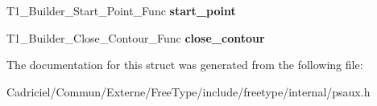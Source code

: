 \begin{DoxyCompactItemize}
\item 
\hypertarget{struct_t1___builder___funcs_rec___ab4897186c65875b4312d4ef68aad9d02}{T1\-\_\-\-Builder\-\_\-\-Start\-\_\-\-Point\-\_\-\-Func {\bfseries start\-\_\-point}}\label{struct_t1___builder___funcs_rec___ab4897186c65875b4312d4ef68aad9d02}

\item 
\hypertarget{struct_t1___builder___funcs_rec___abe163896432cc768719bf87cef0d1266}{T1\-\_\-\-Builder\-\_\-\-Close\-\_\-\-Contour\-\_\-\-Func {\bfseries close\-\_\-contour}}\label{struct_t1___builder___funcs_rec___abe163896432cc768719bf87cef0d1266}

\end{DoxyCompactItemize}


The documentation for this struct was generated from the following file\-:\begin{DoxyCompactItemize}
\item 
Cadriciel/\-Commun/\-Externe/\-Free\-Type/include/freetype/internal/psaux.\-h\end{DoxyCompactItemize}
